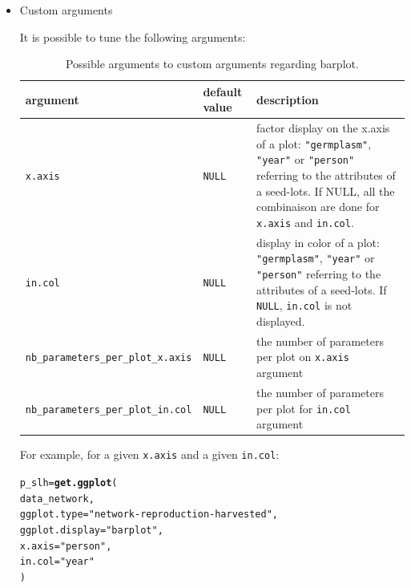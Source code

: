 \documentclass{article}\usepackage[]{graphicx}\usepackage[]{color}
\makeatletter
\newcommand{\hlstr}[1]{\textcolor[rgb]{0.192,0.494,0.8}{#1}}%
\newcommand{\hlstd}[1]{\textcolor[rgb]{0.345,0.345,0.345}{#1}}%
\newcommand{\hlkwb}[1]{\textcolor[rgb]{0.69,0.353,0.396}{#1}}%
\newcommand{\hlkwc}[1]{\textcolor[rgb]{0.333,0.667,0.333}{#1}}%
\newcommand{\hlkwd}[1]{\textcolor[rgb]{0.737,0.353,0.396}{\textbf{#1}}}%
\newenvironment{kframe}{%
 \def\at@end@of@kframe{}%
 \ifinner\ifhmode%
  \def\at@end@of@kframe{\end{minipage}}%
  \begin{minipage}{\columnwidth}%
 \fi\fi%
 \def\FrameCommand##1{\hskip\@totalleftmargin \hskip-\fboxsep
 \colorbox{shadecolor}{##1}\hskip-\fboxsep
     \hskip-\linewidth \hskip-\@totalleftmargin \hskip\columnwidth}%
 \MakeFramed {\advance\hsize-\width
   \@totalleftmargin\z@ \linewidth\hsize
   \@setminipage}}%
 {\par\unskip\endMakeFramed%
 \at@end@of@kframe}
\newenvironment{knitrout}{}{} %
\makeatother
\begin{document}
\begin{itemize}
\begin{center}
\begin{tabular}{cc}
\begin{knitrout}
{}



\end{knitrout}
\\
\end{tabular}
\end{center}

\item Custom arguments

It is possible to tune the following arguments:

\begin{center}
\begin{table}[H]
\begin{tabular}{ p{} p{} p{} }
\hline
argument & default value & description \\
\hline

\texttt{x.axis} & \texttt{NULL} & factor display on the x.axis of a plot: \texttt{"germplasm"}, \texttt{"year"} or \texttt{"person"} referring to the attributes of a seed-lots. If NULL, all the combinaison are done for \texttt{x.axis} and \texttt{in.col}. \\
\hline

\texttt{in.col} & \texttt{NULL} & display in color of a plot: \texttt{"germplasm"}, \texttt{"year"} or \texttt{"person"} referring to the attributes of a seed-lots. If \texttt{NULL}, \texttt{in.col} is not displayed. \\
\hline

\texttt{nb\_parameters\_per\_plot\_x.axis} & \texttt{NULL} & the number of parameters per plot on \texttt{x.axis} argument \\
\hline

\texttt{nb\_parameters\_per\_plot\_in.col} & \texttt{NULL} & the number of parameters per plot for \texttt{in.col} argument \\

\hline
\end{tabular}
\caption{Possible arguments to custom arguments regarding barplot.}
\label{custom.barplot}
\end{table}
\end{center}



For example, for a given \texttt{x.axis} and a given \texttt{in.col}:
\begin{knitrout}
\color{fgcolor}\begin{kframe}
\begin{alltt}
\hlstd{p_slh} \hlkwb{=} \hlkwd{get.ggplot}\hlstd{(}
        \hlstd{data_network,}
        \hlkwc{ggplot.type} \hlstd{=} \hlstr{"network-reproduction-harvested"}\hlstd{,}
        \hlkwc{ggplot.display} \hlstd{=} \hlstr{"barplot"}\hlstd{,}
        \hlkwc{x.axis} \hlstd{=} \hlstr{"person"}\hlstd{,}
        \hlkwc{in.col} \hlstd{=} \hlstr{"year"}
        \hlstd{)}
\end{alltt}
\end{kframe}
\end{knitrout}


\end{itemize}
\end{document}
